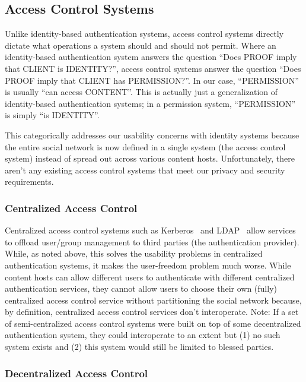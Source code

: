 \documentclass[pdftex,12pt,a4papaer,twoside,notitlepage]{report}
\begin{document}
\subsection{Access Control Systems}

Unlike identity-based authentication systems, access control systems directly
dictate what operations a system should and should not permit. Where an
identity-based authentication system answers the question ``Does PROOF imply
that CLIENT is IDENTITY?'', access control systems answer the question ``Does
PROOF imply that CLIENT has PERMISSION?''. In our case, ``PERMISSION'' is
usually ``can access CONTENT''. This is actually just a generalization of
identity-based authentication systems; in a permission system, ``PERMISSION'' is
simply ``is IDENTITY''.

This categorically addresses our usability concerns with identity systems
because the entire social network is now defined in a single system (the access
control system) instead of spread out across various content hosts.
Unfortunately, there aren't any existing access control systems that meet our
privacy and security requirements.

\subsubsection{Centralized Access Control}

Centralized access control systems such as Kerberos~\cite{kerberos} and
LDAP~\cite{ldap} allow services to offload user/group management to third
parties (the authentication provider). While, as noted above, this solves the
usability problems in centralized authentication systems, it makes the
user-freedom problem much worse. While content hosts can allow different users
to authenticate with different centralized authentication services, they cannot
allow users to choose their own (fully) centralized access control service
without partitioning the social network because, by definition, centralized
access control services don't interoperate. Note: If a set of semi-centralized
access control systems were built on top of some decentralized authentication
system, they could interoperate to an extent but (1) no such system exists and
(2) this system would still be limited to blessed parties.

\subsubsection{Decentralized Access Control}
\end{document}
